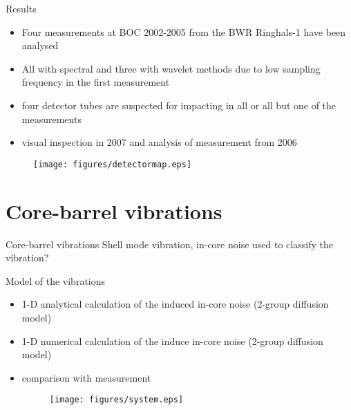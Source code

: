 \documentclass[clock,style=fyma,paper=screen,blackslide,trans=Wipe,mode=present]{powerdot}
\begin{document}
\begin{slide}{Results}
\begin{itemize}
\item Four measurements at BOC 2002-2005 from the BWR Ringhals-1
have been analysed

\item All with spectral and three with wavelet methods due to low
sampling frequency in the first measurement

\item four detector tubes are suspected for impacting in all or
all but one of the measurements

\item visual inspection in 2007 and analysis of measurement from
2006
\end{itemize}
\vspace{-5mm}
\begin{figure}[H]
\centering
\texttt{[image: figures/detectormap.eps]}
\end{figure}
\end{slide}

\section[slide=false]{Core-barrel vibrations}
\begin{slide}{Core-barrel vibrations}
Shell mode vibration, in-core noise used to classify the
vibration?

\begin{figure}[ht]
\end{figure}
\end{slide}

\begin{slide}{Model of the vibrations}
\begin{itemize}
\item 1-D analytical calculation of the induced in-core noise
(2-group diffusion model)

\item 1-D numerical calculation of the induce in-core noise
(2-group diffusion model)

\item comparison with measurement

\begin{figure}[htb]
\centering
\texttt{[image: figures/system.eps]}\\
\end{figure}
\end{itemize}

\end{slide}
\end{document}
